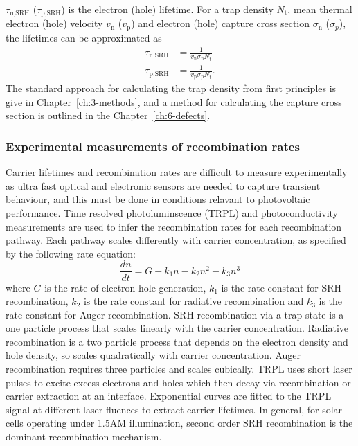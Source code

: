 $\tau_\textrm{n,SRH}$ ($\tau_\textrm{p,SRH}$) is the electron (hole) lifetime. For a trap density $N_\mathrm{t}$, mean thermal electron (hole) velocity $v_\mathrm{n
}$ ($v_\mathrm{p}$) and electron (hole) capture cross section $\sigma_\mathrm{n}$ ($\sigma_p$), the lifetimes can be approximated as 
\begin{align}
\tau_\textrm{n,SRH} &= \frac{1}{v_\mathrm{n}\sigma_\mathrm{n}N_\mathrm{t}} \\
\tau_\textrm{p,SRH} &= \frac{1}{v_\mathrm{p}\sigma_\mathrm{p}N_\mathrm{t}}.
\end{align}
The standard approach for calculating the trap density from first principles is give in Chapter\ \ref{ch:3-methods}, and a method for calculating the capture cross section is outlined in the Chapter\ \ref{ch:6-defects}.

\subsubsection{Experimental measurements of recombination rates} \label{exprecombo}

Carrier lifetimes and recombination rates are difficult to measure experimentally as ultra fast optical and electronic sensors are needed to capture transient behaviour, and this must be done in conditions relavant to photovoltaic performance. Time resolved photoluminscence (TRPL) and photoconductivity measurements are used to infer the recombination rates for each recombination pathway.
Each pathway scales differently with carrier concentration, as specified by the following rate equation:
\begin{equation}
\frac{d n}{d t} = G -k_1n -k_2n^2 -k_3n^3 
\end{equation}
where $G$ is the rate of electron-hole generation, $k_1$ is the rate constant for SRH recombination, $k_2$ is the rate constant for radiative recombination and $k_3$ is the rate constant for Auger recombination. SRH recombination via a trap state is a one particle process that scales linearly with the carrier concentration. Radiative recombination is a two particle process that depends on the electron density and hole density, so scales quadratically with carrier concentration. Auger recombination requires three particles and scales cubically.
TRPL uses short laser pulses to excite excess electrons and holes which then decay via recombination or carrier extraction at an interface. Exponential curves are fitted to the TRPL signal at different laser fluences to extract carrier lifetimes. In general, for solar cells operating under 1.5AM illumination, second order SRH recombination is the dominant recombination mechanism.
% 


